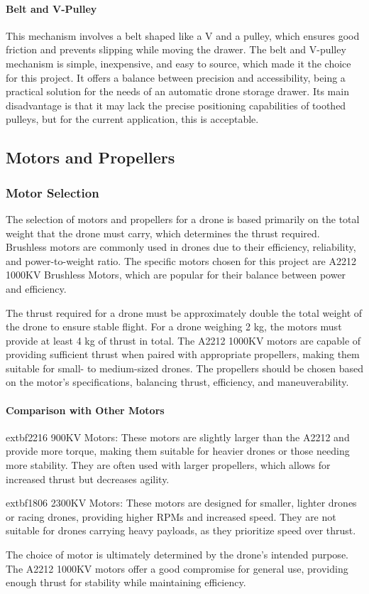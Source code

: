     \paragraph{Belt and V-Pulley} This mechanism involves a belt shaped like a V and a pulley, which ensures good friction and prevents slipping while moving the drawer. The belt and V-pulley mechanism is simple, inexpensive, and easy to source, which made it the choice for this project. It offers a balance between precision and accessibility, being a practical solution for the needs of an automatic drone storage drawer. Its main disadvantage is that it may lack the precise positioning capabilities of toothed pulleys, but for the current application, this is acceptable.

\subsection{Motors and Propellers}
    \subsubsection{Motor Selection}
    The selection of motors and propellers for a drone is based primarily on the total weight that the drone must carry, which determines the thrust required. Brushless motors are commonly used in drones due to their efficiency, reliability, and power-to-weight ratio. The specific motors chosen for this project are A2212 1000KV Brushless Motors, which are popular for their balance between power and efficiency.
    
    The thrust required for a drone must be approximately double the total weight of the drone to ensure stable flight. For a drone weighing 2 kg, the motors must provide at least 4 kg of thrust in total. The A2212 1000KV motors are capable of providing sufficient thrust when paired with appropriate propellers, making them suitable for small- to medium-sized drones. The propellers should be chosen based on the motor's specifications, balancing thrust, efficiency, and maneuverability.
    
    \paragraph{Comparison with Other Motors}
    	extbf{2216 900KV Motors}: These motors are slightly larger than the A2212 and provide more torque, making them suitable for heavier drones or those needing more stability. They are often used with larger propellers, which allows for increased thrust but decreases agility.
    
    	extbf{1806 2300KV Motors}: These motors are designed for smaller, lighter drones or racing drones, providing higher RPMs and increased speed. They are not suitable for drones carrying heavy payloads, as they prioritize speed over thrust.
    
    The choice of motor is ultimately determined by the drone's intended purpose. The A2212 1000KV motors offer a good compromise for general use, providing enough thrust for stability while maintaining efficiency.

    
    


